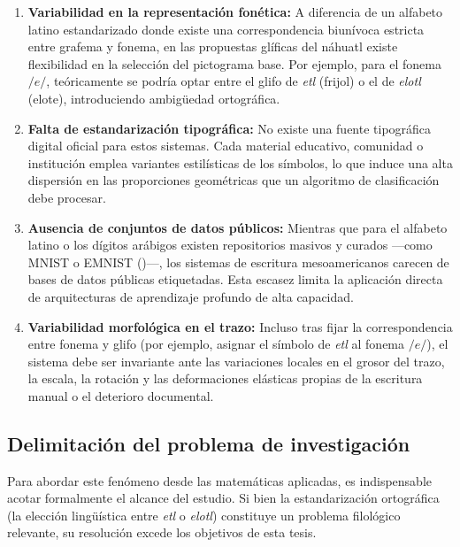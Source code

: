 \documentclass[
  spanish,
  us-letterpaper,
]{scrreprt}
\theoremstyle{definition}
\theoremstyle{remark}
\begin{document}
\begin{enumerate}
\def\labelenumi{\arabic{enumi}.}
\item
  \textbf{Variabilidad en la representación fonética:} A diferencia de
  un alfabeto latino estandarizado donde existe una correspondencia
  biunívoca estricta entre grafema y fonema, en las propuestas glíficas
  del náhuatl existe flexibilidad en la selección del pictograma base.
  Por ejemplo, para el fonema \(/e/\), teóricamente se podría optar
  entre el glifo de \emph{etl} (frijol) o el de \emph{elotl} (elote),
  introduciendo ambigüedad ortográfica.
\item
  \textbf{Falta de estandarización tipográfica:} No existe una fuente
  tipográfica digital oficial para estos sistemas. Cada material
  educativo, comunidad o institución emplea variantes estilísticas de
  los símbolos, lo que induce una alta dispersión en las proporciones
  geométricas que un algoritmo de clasificación debe procesar.
\item
  \textbf{Ausencia de conjuntos de datos públicos:} Mientras que para el
  alfabeto latino o los dígitos arábigos existen repositorios masivos y
  curados ---como MNIST o EMNIST ()---, los sistemas de escritura mesoamericanos carecen de bases
  de datos públicas etiquetadas. Esta escasez limita la aplicación
  directa de arquitecturas de aprendizaje profundo de alta capacidad.
\item
  \textbf{Variabilidad morfológica en el trazo:} Incluso tras fijar la
  correspondencia entre fonema y glifo (por ejemplo, asignar el símbolo
  de \emph{etl} al fonema \(/e/\)), el sistema debe ser invariante ante
  las variaciones locales en el grosor del trazo, la escala, la rotación
  y las deformaciones elásticas propias de la escritura manual o el
  deterioro documental.
\end{enumerate}

\subsection{Delimitación del problema de
investigación}\label{delimitaciuxf3n-del-problema-de-investigaciuxf3n}

Para abordar este fenómeno desde las matemáticas aplicadas, es
indispensable acotar formalmente el alcance del estudio. Si bien la
estandarización ortográfica (la elección lingüística entre \emph{etl} o
\emph{elotl}) constituye un problema filológico relevante, su resolución
excede los objetivos de esta tesis.
\end{document}
